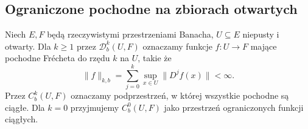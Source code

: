 \subsection{Ograniczone pochodne na zbiorach otwartych}

\begin{definicja}
\label{ma2:def:bounded-differentiable-open}
Niech $E,F$ będą rzeczywistymi przestrzeniami
Banacha, $U\subseteq E$ niepusty i otwarty.
Dla $k\ge1$ przez $\mathcal D_b^k(U,F)$
oznaczamy funkcje $f:U\to F$ mające pochodne
Frécheta do rzędu $k$ na $U$, takie że
\[
 \|f\|_{k,b}=\sum_{j=0}^k\sup_{x\in U}\|D^jf(x)\|
 <\infty.
\]
Przez $C_b^k(U,F)$ oznaczamy podprzestrzeń,
w której wszystkie pochodne są ciągłe.
Dla $k=0$ przyjmujemy $C_b^0(U,F)$ jako przestrzeń
ograniczonych funkcji ciągłych.
\end{definicja}

